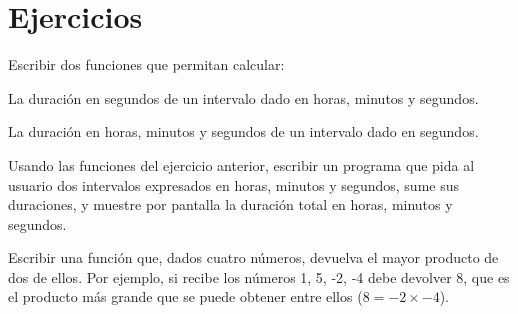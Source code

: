 \newpage
\section{Ejercicios}

\begin{ejercicio} Escribir dos funciones que permitan calcular:
\begin{partes}
    \item La duración en segundos de un intervalo dado en horas, minutos y segundos.
    \item La duración en horas, minutos y segundos de un intervalo dado en segundos.
\end{partes}
\end{ejercicio}

\begin{ejercicio}
Usando las funciones del ejercicio anterior, escribir un programa que pida al
usuario dos intervalos expresados en horas, minutos y segundos, sume sus
duraciones, y muestre por pantalla la duración total en horas, minutos y segundos.
\end{ejercicio}

\begin{ejercicio}
Escribir una función que, dados cuatro números, devuelva el mayor
producto de dos de ellos. Por ejemplo, si recibe los números 1, 5, -2,
-4 debe devolver 8, que es el producto más grande que se puede obtener
entre ellos ($8 = -2 \times -4$).
\end{ejercicio}

